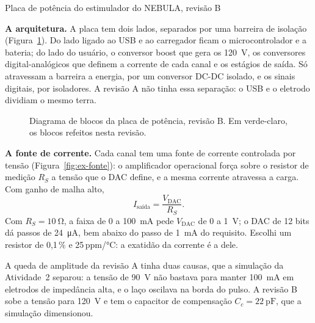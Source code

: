 \begin{atividade}{Placa de potência do estimulador do NEBULA, revisão B}
\begin{desenvolvimento}

\textbf{A arquitetura.} A placa tem dois lados, separados por uma barreira de isolação
(Figura~\ref{fig:ex-blocos}). Do lado ligado ao USB e ao carregador ficam o microcontrolador e a
bateria; do lado do usuário, o conversor boost que gera os \SI{120}{\volt}, os conversores
digital-analógicos que definem a corrente de cada canal e os estágios de saída. Só atravessam a barreira
a energia, por um conversor DC-DC isolado, e os sinais digitais, por isoladores. A revisão A não tinha
essa separação: o USB e o eletrodo dividiam o mesmo terra.

\begin{figure}[htbp]
  \centering
  \resizebox{\linewidth}{!}{}
  \caption{Diagrama de blocos da placa de potência, revisão B. Em verde-claro, os blocos refeitos nesta
    revisão.}
  \label{fig:ex-blocos}
\end{figure}

\textbf{A fonte de corrente.} Cada canal tem uma fonte de corrente controlada por tensão
(Figura~\ref{fig:ex-fonte}): o amplificador operacional força sobre o resistor de medição $R_S$ a
tensão que o DAC define, e a mesma corrente atravessa a carga. Com ganho de malha alto,
\begin{equation}
  I_\text{saída} = \frac{V_\mathrm{DAC}}{R_S}.
  \label{eq:ex-fonte}
\end{equation}
Com $R_S = \SI{10}{\ohm}$, a faixa de 0 a \SI{100}{\milli\ampere} pede $V_\mathrm{DAC}$ de 0 a
\SI{1}{\volt}; o DAC de 12 bits dá passos de \SI{24}{\micro\ampere}, bem abaixo do passo de
\SI{1}{\milli\ampere} do requisito. Escolhi um resistor de 0,1\,\% e 25\,ppm/°C: a exatidão da
corrente é a dele.

A queda de amplitude da revisão A tinha duas causas, que a simulação da Atividade~2 separou: a
tensão de \SI{90}{\volt} não bastava para manter \SI{100}{\milli\ampere} em eletrodos de impedância
alta, e o laço oscilava na borda do pulso. A revisão B sobe a tensão para \SI{120}{\volt} e tem o
capacitor de compensação $C_c = \SI{22}{\pico\farad}$, que a simulação dimensionou.


\end{desenvolvimento}
\end{atividade}
